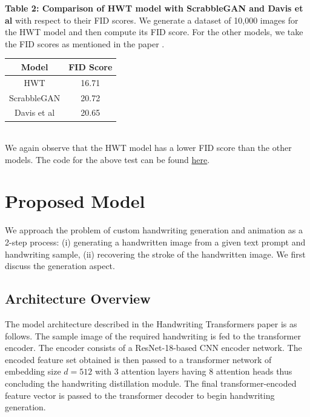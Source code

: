 \documentclass[10pt,twocolumn,letterpaper]{article}
\begin{document}
\noindent
\textbf{Table 2: Comparison of HWT model with ScrabbleGAN\cite{fogel2020scrabblegan} and Davis et al\cite{davis2020text}} with respect to their FID scores. We generate a dataset of 10,000 images for the HWT model and then compute its FID score. For the other models, we take the FID scores as mentioned in the paper \cite{HWT}.
\begin{table}[h]
  \begin{center}
    \begin{tabular}{|c|c|}
      \hline
      \textbf{Model} & \textbf{FID Score} \\
      \hline
      HWT & 16.71 \\
      \hline
      ScrabbleGAN & 20.72 \\
      \hline
      Davis et al & 20.65 \\
      \hline
    \end{tabular}
  \end{center}
\end{table} \\
We again observe that the HWT model has a lower FID score than the other models.
The code for the above test can be found \href{https://github.com/Shambu-K/handwriting-generator-model/blob/main/compute-fid-hwt.ipynb}{here}.

\section{Proposed Model}

We approach the problem of custom handwriting generation and animation as a 2-step process: (i) generating a handwritten image from a given text prompt and handwriting sample, (ii) recovering the stroke of the handwritten image. We first discuss the generation aspect.

\subsection{Architecture Overview}

The model architecture described in the Handwriting Transformers paper is as follows. The sample image of the required handwriting is fed to the transformer encoder. The encoder consists of a ResNet-18-based CNN encoder network. The encoded feature set obtained is then passed to a transformer network of embedding size $d = 512$ with 3 attention layers having 8 attention heads thus concluding the handwriting distillation module. The final transformer-encoded feature vector is passed to the transformer decoder to begin handwriting generation.
\end{document}
